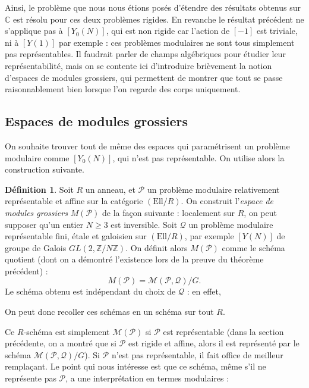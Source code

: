 \documentclass[11pt,a4paper]{article}
\newcommand{\Z}{\mathbb{Z}}
\newcommand{\C}{\mathbb{C}}
\renewcommand{\Pr}{\mathcal{P}}
\newcommand{\Qr}{\mathcal{Q}}
\newcommand{\M}{\mathcal{M}}
\newcommand{\Ell}{\mathrm{Ell}}
\theoremstyle{definition}
\newtheorem*{defi}{Définition}
\begin{document}
Ainsi, le problème que nous nous étions posés d'étendre des résultats obtenus sur $\C$ est résolu pour ces deux problèmes rigides. En revanche le résultat précédent ne s'applique pas à $[Y_0(N)]$, qui est non rigide car l'action de $[-1]$ est triviale, ni à $[Y(1)]$ par exemple : ces problèmes modulaires ne sont tous simplement pas représentables. Il faudrait parler de champs algébriques pour étudier leur représentabilité, mais on se contente ici d'introduire brièvement la notion d'espaces de modules grossiers, qui permettent de montrer que tout se passe raisonnablement bien lorsque l'on regarde des corps uniquement.


\subsection{Espaces de modules grossiers}


On souhaite trouver tout de même des espaces qui paramétrisent un problème modulaire comme $[Y_0(N)]$, qui n'est pas représentable. On utilise alors la construction suivante.

\begin{defi}
Soit $R$ un anneau, et $\Pr$ un problème modulaire relativement représentable et affine sur la catégorie $(\Ell/R)$. On construit l'\emph{espace de modules grossiers} $M(\Pr)$ de la façon suivante : localement sur $R$, on peut supposer qu'un entier $N\geq 3$ est inversible. Soit $\Qr$ un problème modulaire représentable fini, étale et galoisien sur $(\Ell/R)$, par exemple $[Y(N)]$ de groupe de Galois $GL(2, \Z/N\Z)$. On définit alors $M(\Pr)$ comme le schéma quotient (dont on a démontré l'existence lors de la preuve du théorème précédent) :
$$M(\Pr) = \M(\Pr,\Qr)/G.$$
Le schéma obtenu est indépendant du choix de $\Qr$ : en effet,

On peut donc recoller ces schémas en un schéma sur tout $R$.
\end{defi}

Ce $R$-schéma est simplement $\M(\Pr)$ si $\Pr$ est représentable (dans la section précédente, on a montré que si $\Pr$ est rigide et affine, alors il est représenté par le schéma $\M(\Pr,\Qr)/G$). Si $\Pr$ n'est pas représentable, il fait office de meilleur remplaçant. Le point qui nous intéresse est que ce schéma, même s'il ne représente pas $\Pr$, a une interprétation en termes modulaires :
\end{document}
